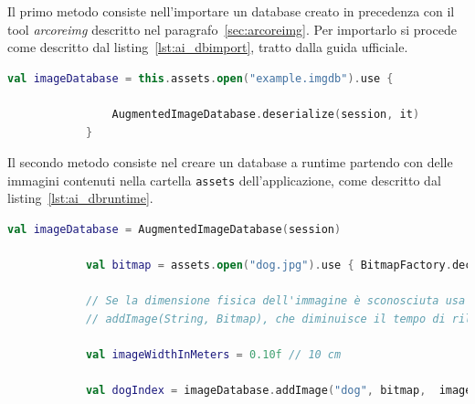 \documentclass[crop=false, class=book]{standalone}
\begin{document}
	\noindent
	Il primo metodo consiste nell'importare un database creato in precedenza con il tool \textit{arcoreimg} descritto nel paragrafo~\vref{sec:arcoreimg}.
	Per importarlo si procede come descritto dal listing~\vref{lst:ai_dbimport}, tratto dalla guida ufficiale.
	
	\begin{center}
		\begin{minipage}{0.95\textwidth}
			\begin{lstlisting}[caption={Importazione database.}, label={lst:ai_dbimport}, language=Kotlin]
			val imageDatabase = this.assets.open("example.imgdb").use {
		 	
		 		AugmentedImageDatabase.deserialize(session, it)
			}
			\end{lstlisting}
		\end{minipage}
	\end{center}
	
	\noindent
	Il secondo metodo consiste nel creare un database a runtime partendo con delle immagini contenuti nella cartella \verb|assets| dell’applicazione, come descritto dal listing~\vref{lst:ai_dbruntime}.
	\\
	\begin{center}
		\begin{minipage}{0.95\textwidth}
			\begin{lstlisting}[caption={Creazione del database.}, label={lst:ai_dbruntime}, language=Kotlin]
			val imageDatabase = AugmentedImageDatabase(session)
			
			val bitmap = assets.open("dog.jpg").use { BitmapFactory.decodeStream(it) }
			
			// Se la dimensione fisica dell'immagine è sconosciuta usa il metodo 
			// addImage(String, Bitmap), che diminuisce il tempo di rilevamento dell'immagine.
			
			val imageWidthInMeters = 0.10f // 10 cm
			
			val dogIndex = imageDatabase.addImage("dog", bitmap,  imageWidthInMeters)
			\end{lstlisting}
		\end{minipage}
	\end{center}
	
\end{document}
